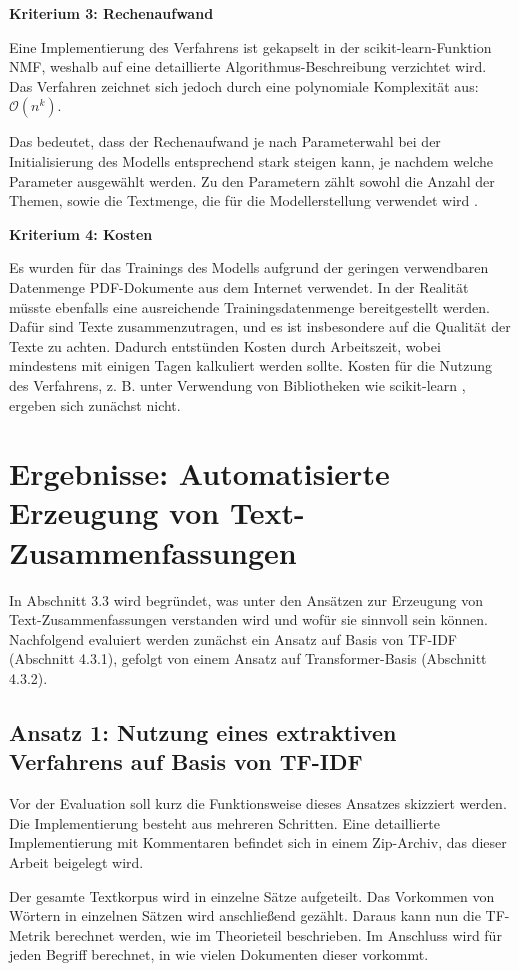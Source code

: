 {\bf Kriterium 3: Rechenaufwand}

Eine Implementierung des Verfahrens ist gekapselt in der scikit-learn-Funktion NMF, weshalb auf eine detaillierte Algorithmus-Beschreibung verzichtet wird. Das Verfahren zeichnet sich jedoch durch eine polynomiale Komplexität aus: $\mathcal{O}(n^k)$.

Das bedeutet, dass der Rechenaufwand je nach Parameterwahl bei der Initialisierung des Modells entsprechend stark steigen kann, je nachdem welche Parameter ausgewählt werden. Zu den Parametern zählt sowohl die Anzahl der Themen, sowie die Textmenge, die für die Modellerstellung verwendet wird \cite{scikit1}.

{\bf Kriterium 4: Kosten}

Es wurden für das Trainings des Modells aufgrund der geringen verwendbaren Datenmenge PDF-Dokumente aus dem Internet verwendet. In der Realität müsste ebenfalls eine ausreichende Trainingsdatenmenge bereitgestellt werden. Dafür sind Texte zusammenzutragen, und es ist insbesondere auf die Qualität der Texte zu achten. Dadurch entstünden Kosten durch Arbeitszeit, wobei mindestens mit einigen Tagen kalkuliert werden sollte. Kosten für die Nutzung des Verfahrens, z. B. unter Verwendung von Bibliotheken wie scikit-learn \cite{scikit-license}, ergeben sich zunächst nicht.

\section{Ergebnisse: Automatisierte Erzeugung von Text-Zusammenfassungen}

In Abschnitt 3.3 wird begründet, was unter den Ansätzen zur Erzeugung von Text-Zusammenfassungen verstanden wird und wofür sie sinnvoll sein können. Nachfolgend evaluiert werden zunächst ein Ansatz auf Basis von TF-IDF (Abschnitt 4.3.1), gefolgt von einem Ansatz auf Transformer-Basis (Abschnitt 4.3.2). 

\subsection{Ansatz 1: Nutzung eines extraktiven Verfahrens auf Basis von TF-IDF}

Vor der Evaluation soll kurz die Funktionsweise dieses Ansatzes skizziert werden. Die Implementierung besteht aus mehreren Schritten. Eine detaillierte Implementierung mit Kommentaren befindet sich in einem Zip-Archiv, das dieser Arbeit beigelegt wird.

Der gesamte Textkorpus wird in einzelne Sätze aufgeteilt. Das Vorkommen von Wörtern in einzelnen Sätzen wird anschließend gezählt. Daraus kann nun die TF-Metrik berechnet werden, wie im Theorieteil beschrieben. Im Anschluss wird für jeden Begriff berechnet, in wie vielen Dokumenten dieser vorkommt.

